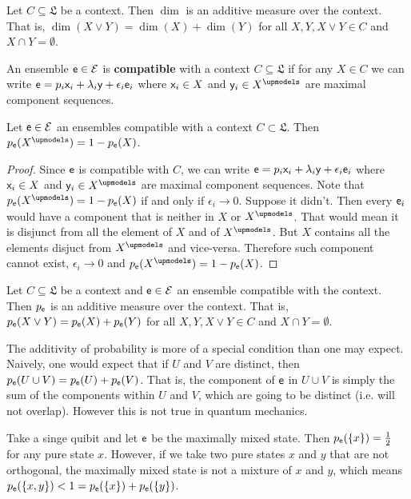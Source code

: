 \begin{conj}
	Let $C \subseteq \mathfrak{L}$ be a context. Then $\dim$ is an additive measure over the context. That is, $\dim(X \vee Y) = \dim(X) + \dim(Y)$ for all $X, Y, X \vee Y \in C$ and $X \cap Y = \emptyset$.
\end{conj}

\begin{defn}
	An ensemble $\ens \in \Ens$ is \textbf{compatible} with a context $C \subseteq \mathfrak{L}$ if for any $X \in C$ we can write $\ens = p_i \ens[x]_i + \lambda_i \ens[y] + \epsilon_i \ens_i$ where $\ens[x]_i \in X$ and $\ens[y]_i \in X^\disjunct$ are maximal component sequences.
\end{defn}

\begin{coro}
	Let $\ens \in \Ens$ an ensembles compatible with a context $C \subset \mathfrak{L}$. Then $p_{\ens}(X^\disjunct) = 1 - p_{\ens}(X)$.
\end{coro}

\begin{proof}
	Since $\ens$ is compatible with $C$, we can write $\ens = p_i \ens[x]_i + \lambda_i \ens[y] + \epsilon_i \ens_i$ where $\ens[x]_i \in X$ and $\ens[y]_i \in X^\disjunct$ are maximal component sequences. Note that $p_{\ens}(X^\disjunct) = 1 - p_{\ens}(X)$ if and only if $\epsilon_i \to 0$. Suppose it didn't. Then every $\ens_i$ would have a component that is neither in $X$ or $X^\disjunct$. That would mean it is disjunct from all the element of $X$ and of $X^\disjunct$. But $X$ contains all the elements disjuct from $X^\disjunct$ and vice-versa. Therefore such component cannot exist, $\epsilon_i \to 0$ and $p_{\ens}(X^\disjunct) = 1 - p_{\ens}(X)$.
\end{proof}

\begin{conj}
	Let $C \subseteq \mathfrak{L}$ be a context and $\ens \in \Ens$ an ensemble compatible with the context. Then $p_{\ens}$ is an additive measure over the context. That is, $p_{\ens}(X \vee Y) = p_{\ens}(X) + p_{\ens}(Y)$ for all $X, Y, X \vee Y \in C$ and $X \cap Y = \emptyset$.
\end{conj}

\begin{remark}
	The additivity of probability is more of a special condition than one may expect. Naively, one would expect that if $U$ and $V$ are distinct, then $p_{\ens}(U \cup V) = p_{\ens}(U) + p_{\ens}(V)$. That is, the component of $\ens$ in $U \cup V$ is simply the sum of the components within $U$ and $V$, which are going to be distinct (i.e. will not overlap). However this is not true in quantum mechanics.
	
	Take a singe quibit and let $\ens$ be the maximally mixed state. Then $p_{\ens}(\{x\}) = \frac{1}{2}$ for any pure state $x$. However, if we take two pure states $x$ and $y$ that are not orthogonal, the maximally mixed state is not a mixture of $x$ and $y$, which means $p_{\ens}(\{x, y\}) < 1 = p_{\ens}(\{x\}) + p_{\ens}(\{y\})$.
\end{remark}

